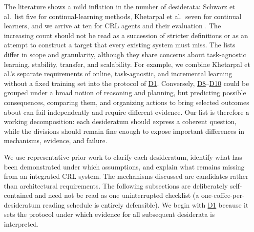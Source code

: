 \documentclass[10pt,journal,compsoc]{IEEEtran}
\DeclareRobustCommand{\Dref}[1]{\hyperref[sec:d#1]{D#1}}
\begin{document}
The literature shows a mild inflation in the number of desiderata: Schwarz et al.\ list five for continual-learning methods, Khetarpal et al.\ seven for continual learners, and we arrive at ten for CRL agents and their evaluation \cite{schwarz2018,khetarpal2022}.
The increasing count should not be read as a succession of stricter definitions or as an attempt to construct a target that every existing system must miss.
The lists differ in scope and granularity, although they share concerns about task-agnostic learning, stability, transfer, and scalability.
For example, we combine Khetarpal et al.'s separate requirements of online, task-agnostic, and incremental learning without a fixed training set into the protocol of \Dref{1}.
Conversely, \Dref{8}--\Dref{10} could be grouped under a broad notion of reasoning and planning, but predicting possible consequences, comparing them, and organizing actions to bring selected outcomes about can fail independently and require different evidence.
Our list is therefore a working decomposition: each desideratum should express a coherent question, while the divisions should remain fine enough to expose important differences in mechanisms, evidence, and failure.

We use representative prior work to clarify each desideratum, identify what has been demonstrated under which assumptions, and explain what remains missing from an integrated CRL system.
The mechanisms discussed are candidates rather than architectural requirements.
The following subsections are deliberately self-contained and need not be read as one uninterrupted checklist (a one-coffee-per-desideratum reading schedule is entirely defensible).
We begin with \Dref{1} because it sets the protocol under which evidence for all subsequent desiderata is interpreted.
\end{document}
